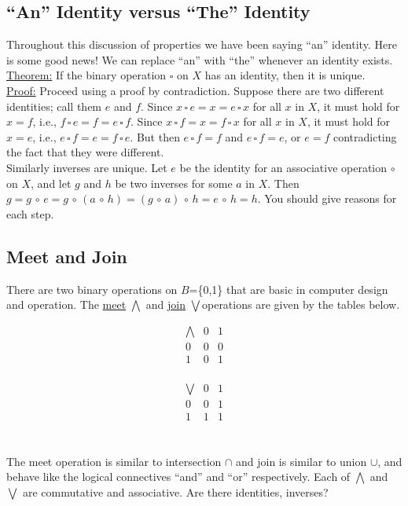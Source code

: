 \documentclass[12pt]{book}
\theoremstyle{definition}
\begin{document}
\subsection{``An'' Identity versus ``The'' Identity}
Throughout this discussion of properties we have been saying ``an'' identity.  Here is some good news!  We can replace ``an'' with ``the'' whenever an identity exists.\\[.5in]
\underline{Theorem:} If the binary operation $\square$ on $X$ has an identity, then it is unique.\\
\underline{Proof:} Proceed using a proof by contradiction.  Suppose there are two different identities; call them $e$ and $f$.  Since $x\,\square\, e=x=e\,\square\, x$ for all $x$ in $X$, it must hold for $x=f$, i.e., $f\,\square\, e= f = e\,\square\, f$.  Since $x\,\square\, f=x=f\,\square\, x$ for all $x$ in $X$, it must hold for $x=e$, i.e., $e\,\square\, f=e=f\,\square\, e$.  But then $e\,\square\, f=f$ and $e\,\square\, f =e$, or $e=f$ contradicting the fact that they were different.\\[.1in]

Similarly inverses are  unique.  Let $e$ be the identity for an associative operation $\circ$ on $X$, and let $g$ and $h$ be two inverses for some $a$ in $X$.  Then $g=g\,\circ\, e=g\,\circ\,(a\,\circ\, h)=(g\,\circ\, a)\,\circ\, h=e\,\circ\, h = h$.  You should give reasons for each step.\\[.1in]

\subsection{Meet and Join}
There are two binary operations on $B$=\{0,1\} that are basic in computer design and operation.  The \underline{meet} $\bigwedge$ and \underline{join} $\bigvee$operations are given by the tables below.\\[.3in]
\begin{minipage}{3in}
$$\begin{array}{c|cc}
\bigwedge & 0 & 1\\
\hline
0 & 0 & 0\\
1& 0 & 1\\
\end{array}$$
\end{minipage}
\begin{minipage}{3.5in}
$$\begin{array}{c|cc}
\bigvee & 0 & 1\\
\hline
0 & 0 & 1\\
1& 1 & 1\\
\end{array}$$
\end{minipage}\\[.3in]
The meet operation is similar to intersection $\cap$ and join is similar to union $\cup$, and behave like the logical connectives ``and'' and ``or'' respectively.  Each of $\bigwedge$ and $\bigvee$ are commutative and associative.  Are there identities, inverses?
\end{document}
